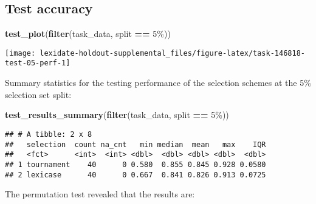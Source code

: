 \documentclass[
]{book}
\newenvironment{Shaded}{\begin{snugshade}}{\end{snugshade}}
\newcommand{\AttributeTok}[1]{\textcolor[rgb]{0.13,0.29,0.53}{#1}}
\newcommand{\DecValTok}[1]{\textcolor[rgb]{0.00,0.00,0.81}{#1}}
\newcommand{\FunctionTok}[1]{\textcolor[rgb]{0.13,0.29,0.53}{\textbf{#1}}}
\newcommand{\NormalTok}[1]{#1}
\newcommand{\OtherTok}[1]{\textcolor[rgb]{0.56,0.35,0.01}{#1}}
\newcommand{\SpecialCharTok}[1]{\textcolor[rgb]{0.81,0.36,0.00}{\textbf{#1}}}
\newcommand{\StringTok}[1]{\textcolor[rgb]{0.31,0.60,0.02}{#1}}
\begin{document}
\hypertarget{test-accuracy}{%
\subsection{Test accuracy}\label{test-accuracy}}

\begin{Shaded}
\begin{Highlighting}[]
\FunctionTok{test\_plot}\NormalTok{(}\FunctionTok{filter}\NormalTok{(task\_data, split }\SpecialCharTok{==} \StringTok{\textquotesingle{}5\%\textquotesingle{}}\NormalTok{))}
\end{Highlighting}
\end{Shaded}

\texttt{[image: lexidate-holdout-supplemental\_files/figure-latex/task-146818-test-05-perf-1]}

Summary statistics for the testing performance of the selection schemes at the 5\% selection set split:

\begin{Shaded}
\begin{Highlighting}[]
\FunctionTok{test\_results\_summary}\NormalTok{(}\FunctionTok{filter}\NormalTok{(task\_data, split }\SpecialCharTok{==} \StringTok{\textquotesingle{}5\%\textquotesingle{}}\NormalTok{))}
\end{Highlighting}
\end{Shaded}

\begin{verbatim}
## # A tibble: 2 x 8
##   selection  count na_cnt   min median  mean   max    IQR
##   <fct>      <int>  <int> <dbl>  <dbl> <dbl> <dbl>  <dbl>
## 1 tournament    40      0 0.580  0.855 0.845 0.928 0.0580
## 2 lexicase      40      0 0.667  0.841 0.826 0.913 0.0725
\end{verbatim}

The permutation test revealed that the results are:

\begin{Shaded}
\end{Shaded}
\end{document}
